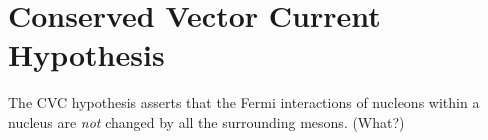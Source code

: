 %
%
%
%
%

\section{Conserved Vector Current Hypothesis}
The CVC hypothesis asserts that the Fermi interactions of nucleons within a nucleus are \emph{not} changed by all the surrounding mesons.  (What?)



